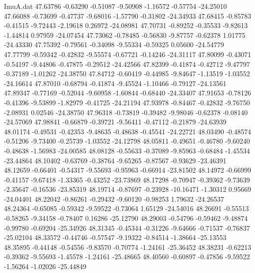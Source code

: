 \begin{filecontents}{ImuA.dat}
  47.63786   -0.63290   -0.51087   -9.50908   -1.16572   -0.57754  -24.25010
  47.66088   -0.73699   -0.47737   -9.68016   -1.57790   -0.31802  -24.34933
  47.68415   -0.85783   -0.41515   -9.72443   -2.19618    0.26972  -24.08981
  47.70731   -0.89252   -0.35533   -9.82613   -1.44814    0.97959  -24.07454
  47.73062   -0.78485   -0.56830   -9.87757   -0.62378    1.01775  -24.43330
  47.75392   -0.79561   -0.34098   -9.55334   -0.59325    0.05600  -24.54779
  47.77799   -0.59342   -0.42832   -9.55574   -0.67721   -0.14246  -24.31117
  47.80099   -0.43071   -0.54197   -9.44806   -0.47875   -0.29512  -24.42566
  47.82399   -0.41874   -0.42712   -9.47797   -0.37189   -1.01262  -24.38750
  47.84712   -0.60419   -0.44985   -9.84647   -1.13519   -1.03552  -24.16614
  47.87010   -0.68794   -0.41874   -9.45524   -1.10466   -0.79127  -24.13561
  47.89347   -0.77169   -0.52044   -9.60958   -1.60844   -0.68440  -24.33407
  47.91653   -0.78126   -0.41396   -9.53899   -1.82979   -0.41725  -24.21194
  47.93978   -0.84467   -0.42832   -9.76750   -2.08931    0.02546  -24.38750
  47.96318   -0.73819   -0.39482   -9.98046   -0.62378   -0.08140  -24.57069
  47.98841   -0.66879   -0.39721   -9.56411   -0.47112   -0.21879  -24.63939
  48.01174   -0.49531   -0.42353   -9.48635   -0.48638   -0.45541  -24.22721
  48.03490   -0.48574   -0.51206   -9.73400   -0.25739   -1.03552  -24.12798
  48.05811   -0.49651   -0.46780   -9.60240   -0.48638   -1.56983  -24.00585
  48.08128   -0.55633   -0.37089   -9.85963   -0.68484   -1.45534  -23.44864
  48.10402   -0.63769   -0.38764   -9.65265   -0.87567   -0.93629  -23.46391
  48.12659   -0.66401   -0.54317   -9.55693   -0.95963   -0.66914  -23.81502
  48.14972   -0.66999   -0.41157   -9.67418   -1.33365   -0.43252  -23.73869
  48.17298   -0.70947   -0.39362   -9.73639   -2.35647   -0.16536  -23.85319
  48.19714   -0.87697   -0.23928  -10.16471   -1.30312    0.95669  -24.04401
  48.22042   -0.86261   -0.29432   -9.60120   -0.98253    1.79632  -24.26537
  48.24364   -0.65085   -0.59342   -9.59522   -0.73064    1.65129  -24.54016
  48.26691   -0.55513   -0.58265   -9.34158   -0.78407    0.16286  -25.12790
  48.29003   -0.54796   -0.59462   -9.48874   -0.99780   -0.69204  -25.34926
  48.31345   -0.45344   -0.31226   -9.64666   -0.71537   -0.76837  -25.02104
  48.33572   -0.44746   -0.57547   -9.19322   -0.84514   -1.38664  -25.13553
  48.35895   -0.44148   -0.54556   -9.83570   -0.70774   -1.24161  -25.36452
  48.38231   -0.62213   -0.39362   -9.55693   -1.45578   -1.24161  -25.48665
  48.40560   -0.60897   -0.47856   -9.59522   -1.56264   -1.02026  -25.44849

\end{filecontents}

